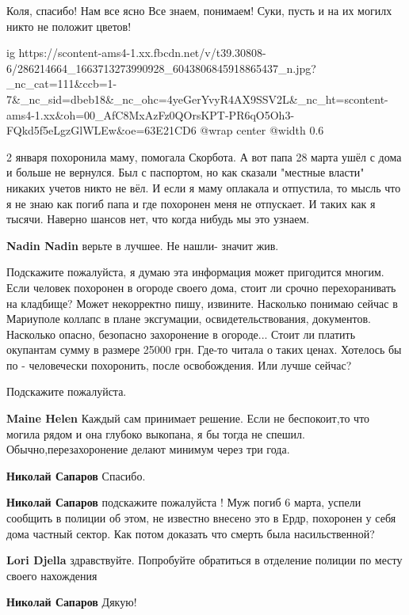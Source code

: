 
Коля, спасибо! Нам все ясно Все знаем, понимаем! Суки, пусть и на их могилх никто не положит цветов!


\ifcmt
  ig https://scontent-ams4-1.xx.fbcdn.net/v/t39.30808-6/286214664_1663713273990928_6043806845918865437_n.jpg?_nc_cat=111&ccb=1-7&_nc_sid=dbeb18&_nc_ohc=4yeGerYvyR4AX9SSV2L&_nc_ht=scontent-ams4-1.xx&oh=00_AfC8MxAzFz0QOrsKPT-PR6qO5Oh3-FQkd5f5eLgzGlWLEw&oe=63E21CD6
  @wrap center
  @width 0.6
\fi


2 января похоронила маму, помогала Скорбота. А вот папа 28 марта ушёл с дома и
больше не вернулся. Был с паспортом, но как сказали "местные власти" никаких
учетов никто не вёл. И если я маму оплакала и отпустила, то мысль что я не знаю
как погиб папа и где похоронен меня не отпускает. И таких как я тысячи. Наверно
шансов нет, что когда нибудь мы это узнаем.

\begin{itemize} %
\textbf{Nadin Nadin} верьте в лучшее. Не нашли- значит жив.
\end{itemize} %


Подскажите пожалуйста, я думаю эта информация может пригодится многим. Если
человек похоронен в огороде своего дома, стоит ли срочно перехоранивать на
кладбище? Может некорректно пишу, извините. Насколько понимаю сейчас в
Мариуполе коллапс в плане эксгумации, освидетельствования, документов.
Насколько опасно, безопасно захоронение в огороде... Стоит ли платить окупантам
сумму в размере 25000 грн. Где-то читала о таких ценах. Хотелось бы по -
человечески похоронить, после освобождения. Или лучше сейчас?

Подскажите пожалуйста.

\begin{itemize} %
\textbf{Maine Helen} Каждый сам принимает решение. Если не беспокоит,то что могила рядом и она глубоко выкопана, я бы тогда не спешил. Обычно,перезахоронение делают минимум через три года.

\textbf{Николай Сапаров} Спасибо.

\textbf{Николай Сапаров} подскажите пожалуйста ! Муж погиб 6 марта, успели сообщить в полиции об этом, не известно внесено это в Ердр, похоронен у себя дома частный сектор. Как потом доказать что смерть была насильственной?

\textbf{Lori Djella} здравствуйте. Попробуйте обратиться в отделение полиции по месту своего нахождения

\textbf{Николай Сапаров} Дякую!

\end{itemize} %

